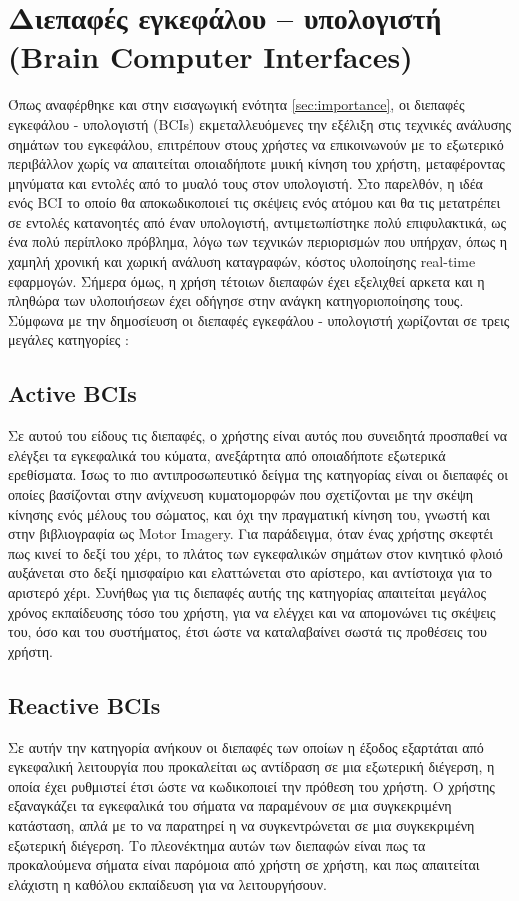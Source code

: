 \documentclass[11pt,a4paper,english,greek,twoside]{../Thesis}
\begin{document}
\section{Διεπαφές εγκεφάλου – υπολογιστή (Brain Computer Interfaces)}
  \par Όπως αναφέρθηκε και στην εισαγωγική ενότητα \ref{sec:importance}, οι διεπαφές εγκεφάλου - υπολογιστή (BCIs) εκμεταλλευόμενες την εξέλιξη στις τεχνικές ανάλυσης σημάτων του εγκεφάλου, επιτρέπουν στους χρήστες να επικοινωνούν με το εξωτερικό περιβάλλον χωρίς να απαιτείται οποιαδήποτε μυική κίνηση του χρήστη, μεταφέροντας μηνύματα και εντολές από το μυαλό τους στον υπολογιστή. Στο παρελθόν, η ιδέα ενός BCI το οποίο θα αποκωδικοποιεί τις σκέψεις ενός ατόμου και θα τις μετατρέπει σε εντολές κατανοητές από έναν υπολογιστή, αντιμετωπίστηκε πολύ επιφυλακτικά, ως ένα πολύ περίπλοκο πρόβλημα, λόγω των τεχνικών περιορισμών που υπήρχαν, όπως η χαμηλή χρονική και χωρική ανάλυση καταγραφών, κόστος υλοποίησης real-time εφαρμογών. Σήμερα όμως, η χρήση τέτοιων διεπαφών έχει εξελιχθεί αρκετα και η πληθώρα των υλοποιήσεων έχει οδήγησε στην ανάγκη κατηγοριοποίησης τους. Σύμφωνα με την δημοσίευση \cite{Zander2010-ji} οι διεπαφές εγκεφάλου - υπολογιστή χωρίζονται σε τρεις μεγάλες κατηγορίες : 
  \label{sec:bci_categories}
  \subsection{Active BCIs}
  \par Σε αυτού του είδους τις διεπαφές, ο χρήστης είναι αυτός που συνειδητά προσπαθεί να ελέγξει τα εγκεφαλικά του κύματα, ανεξάρτητα από οποιαδήποτε εξωτερικά ερεθίσματα. Ίσως το πιο αντιπροσωπευτικό δείγμα της κατηγορίας είναι οι διεπαφές οι οποίες βασίζονται στην ανίχνευση κυματομορφών που σχετίζονται με την σκέψη κίνησης ενός μέλους του σώματος, και όχι την πραγματική κίνηση του, γνωστή και στην βιβλιογραφία ως Motor Imagery. Για παράδειγμα, όταν ένας χρήστης σκεφτέι πως κινεί το δεξί του χέρι, το πλάτος των εγκεφαλικών σημάτων στον κινητικό φλοιό αυξάνεται στο δεξί ημισφαίριο και ελαττώνεται στο αρίστερο, και αντίστοιχα για το αριστερό χέρι. Συνήθως για τις διεπαφές αυτής της κατηγορίας απαιτείται μεγάλος χρόνος εκπαίδευσης τόσο του χρήστη, για να ελέγχει και να απομονώνει τις σκέψεις του, όσο και του συστήματος, έτσι ώστε να καταλαβαίνει σωστά τις προθέσεις του χρήστη. 

  \subsection{Reactive BCIs}
  \par Σε αυτήν την κατηγορία ανήκουν οι διεπαφές των οποίων η έξοδος εξαρτάται από εγκεφαλική λειτουργία που προκαλείται ως αντίδραση σε μια εξωτερική διέγερση, η οποία έχει ρυθμιστεί έτσι ώστε να κωδικοποιεί την πρόθεση του χρήστη. Ο χρήστης εξαναγκάζει τα εγκεφαλικά του σήματα να παραμένουν σε μια συγκεκριμένη κατάσταση, απλά με το να παρατηρεί η να συγκεντρώνεται σε μια συγκεκριμένη εξωτερική διέγερση. Το πλεονέκτημα αυτών των διεπαφών είναι πως τα προκαλούμενα σήματα είναι παρόμοια από χρήστη σε χρήστη, και πως απαιτείται ελάχιστη η καθόλου εκπαίδευση για να λειτουργήσουν.
\end{document}
